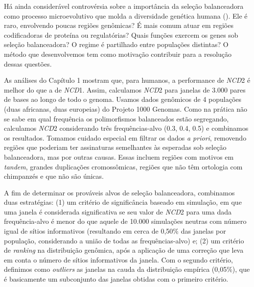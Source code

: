 \begin{refsection}
Há ainda considerável controvérsia sobre a importância da seleção balanceadora como processo microevolutivo que molda a diversidade genética humana (\cite{Andres2009,Bubb2006,Leffler2013a}). Ele é raro, envolvendo poucas regiões genômicas? É mais comum atuar em regiões codificadoras de proteína ou regulatórias? Quais funções exercem os genes sob seleção balanceadora? O regime é partilhado entre populações distintas? O método que desenvolvemos tem como motivação contribuir para a resolução dessas questões.

As análises do Capítulo 1 mostram que, para humanos, a performance de \emph{NCD}2 é melhor do que a de \emph{NCD}1. Assim, calculamos \emph{NCD}2 para janelas de 3.000 pares de bases ao longo de todo o genoma. Usamos dados genômicos de 4 populações (duas africanas, duas europeias) do Projeto 1000 Genomas. Como na prática não se sabe em qual frequência os polimorfismos balanceados estão segregando, calculamos \emph{NCD}2 considerando três frequências-alvo (0.3, 0.4, 0.5) e combinamos os resultados. Tomamos cuidado especial em filtrar os dados \emph{a priori}, removendo regiões que poderiam ter assinaturas semelhantes às esperadas sob seleção balanceadora, mas por outras causas. Essas incluem regiões
com motivos em \emph{tandem}, grandes duplicações cromossômicas, regiões que não têm ortologia com chimpanzés e que não são únicas.

A fim de determinar os prováveis alvos de seleção balanceadora, combinamos duas estratégias: (1) um critério de significância baseado em simulação, em que uma janela é considerada significativa se seu valor de \emph{NCD}2 para uma dada frequência-alvo é menor do que aquele de 10.000 simulações neutras com número igual de sítios informativos (resultando em cerca de 0,50\% das janelas por população, considerando a união de todas as frequências-alvo) e; (2) um critério de \emph{ranking} na distribuição genômica, após a aplicação de uma correção que leva em conta o número de sítios informativos da janela. Com o segundo critério, definimos como \emph{outliers} as janelas na cauda da distribuição empírica (0,05\%), que é basicamente um subconjunto das janelas obtidas com o primeiro critério.


\end{refsection}
